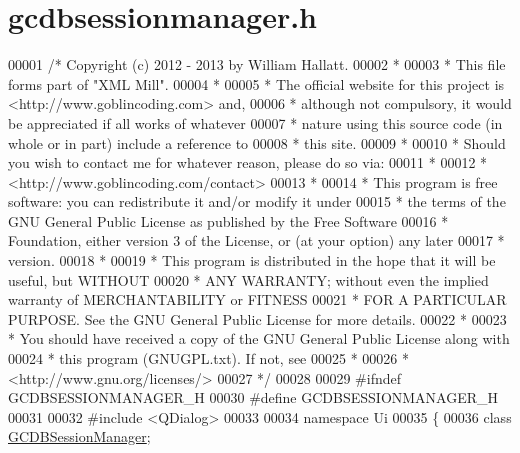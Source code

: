 \hypertarget{gcdbsessionmanager_8h_source}{\section{gcdbsessionmanager.\-h}
}

\begin{DoxyCode}
00001 \textcolor{comment}{/* Copyright (c) 2012 - 2013 by William Hallatt.}
00002 \textcolor{comment}{ *}
00003 \textcolor{comment}{ * This file forms part of "XML Mill".}
00004 \textcolor{comment}{ *}
00005 \textcolor{comment}{ * The official website for this project is <http://www.goblincoding.com> and,}
00006 \textcolor{comment}{ * although not compulsory, it would be appreciated if all works of whatever}
00007 \textcolor{comment}{ * nature using this source code (in whole or in part) include a reference to}
00008 \textcolor{comment}{ * this site.}
00009 \textcolor{comment}{ *}
00010 \textcolor{comment}{ * Should you wish to contact me for whatever reason, please do so via:}
00011 \textcolor{comment}{ *}
00012 \textcolor{comment}{ *                 <http://www.goblincoding.com/contact>}
00013 \textcolor{comment}{ *}
00014 \textcolor{comment}{ * This program is free software: you can redistribute it and/or modify it
       under}
00015 \textcolor{comment}{ * the terms of the GNU General Public License as published by the Free
       Software}
00016 \textcolor{comment}{ * Foundation, either version 3 of the License, or (at your option) any later}
00017 \textcolor{comment}{ * version.}
00018 \textcolor{comment}{ *}
00019 \textcolor{comment}{ * This program is distributed in the hope that it will be useful, but WITHOUT}
00020 \textcolor{comment}{ * ANY WARRANTY; without even the implied warranty of MERCHANTABILITY or
       FITNESS}
00021 \textcolor{comment}{ * FOR A PARTICULAR PURPOSE.  See the GNU General Public License for more
       details.}
00022 \textcolor{comment}{ *}
00023 \textcolor{comment}{ * You should have received a copy of the GNU General Public License along with}
00024 \textcolor{comment}{ * this program (GNUGPL.txt).  If not, see}
00025 \textcolor{comment}{ *}
00026 \textcolor{comment}{ *                    <http://www.gnu.org/licenses/>}
00027 \textcolor{comment}{ */}
00028 
00029 \textcolor{preprocessor}{#ifndef GCDBSESSIONMANAGER\_H}
00030 \textcolor{preprocessor}{}\textcolor{preprocessor}{#define GCDBSESSIONMANAGER\_H}
00031 \textcolor{preprocessor}{}
00032 \textcolor{preprocessor}{#include <QDialog>}
00033 
00034 \textcolor{keyword}{namespace }Ui
00035 \{
00036   \textcolor{keyword}{class }\hyperlink{class_g_c_d_b_session_manager}{GCDBSessionManager};

\end{DoxyCode}
